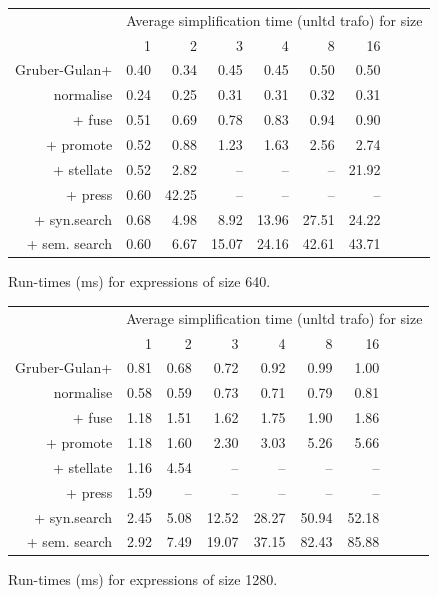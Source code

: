\begin{figure}\begin{tabular}{rrrrrrrrrr}
 & \multicolumn{9}{c}{Average simplification time (unltd trafo) for size} \\
 & 1 & 2 & 3 & 4 & 8 & 16 \\
Gruber-Gulan+ & 0.40 & 0.34 & 0.45 & 0.45 & 0.50 & 0.50 \\
normalise & 0.24 & 0.25 & 0.31 & 0.31 & 0.32 & 0.31 \\
+ fuse & 0.51 & 0.69 & 0.78 & 0.83 & 0.94 & 0.90 \\
+ promote & 0.52 & 0.88 & 1.23 & 1.63 & 2.56 & 2.74 \\
+ stellate & 0.52 & 2.82 & -- & -- & -- & 21.92 \\
+ press & 0.60 & 42.25 & -- & -- & -- & -- \\
+ syn.search & 0.68 & 4.98 & 8.92 & 13.96 & 27.51 & 24.22 \\
+ sem. search & 0.60 & 6.67 & 15.07 & 24.16 & 42.61 & 43.71 \\
\end{tabular}\caption{Run-times (ms) for expressions of size 640.}\end{figure}
\begin{figure}\begin{tabular}{rrrrrrrrrr}
 & \multicolumn{9}{c}{Average simplification time (unltd trafo) for size} \\
 & 1 & 2 & 3 & 4 & 8 & 16 \\
Gruber-Gulan+ & 0.81 & 0.68 & 0.72 & 0.92 & 0.99 & 1.00 \\
normalise & 0.58 & 0.59 & 0.73 & 0.71 & 0.79 & 0.81 \\
+ fuse & 1.18 & 1.51 & 1.62 & 1.75 & 1.90 & 1.86 \\
+ promote & 1.18 & 1.60 & 2.30 & 3.03 & 5.26 & 5.66 \\
+ stellate & 1.16 & 4.54 & -- & -- & -- & -- \\
+ press & 1.59 & -- & -- & -- & -- & -- \\
+ syn.search & 2.45 & 5.08 & 12.52 & 28.27 & 50.94 & 52.18 \\
+ sem. search & 2.92 & 7.49 & 19.07 & 37.15 & 82.43 & 85.88 \\
\end{tabular}\caption{Run-times (ms) for expressions of size 1280.}\end{figure}
